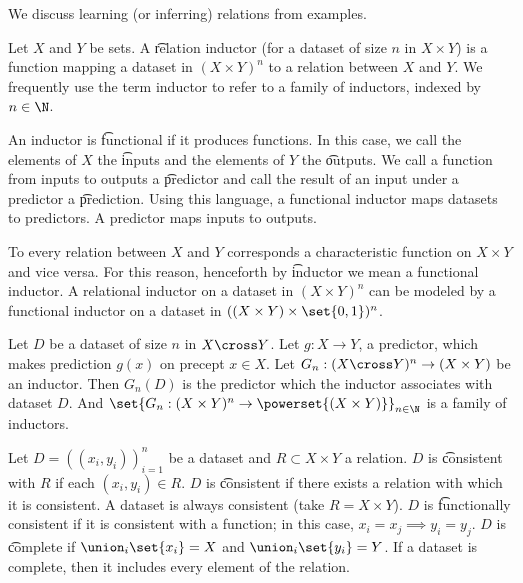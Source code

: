 

We discuss learning (or inferring) relations from examples.


Let $X$ and $Y$ be sets.
A \t{relation inductor} (for a dataset of size $n$ in $X \times Y$) is a function mapping a dataset in $(X \times Y)^n$ to a relation between $X$ and $Y$.
We frequently use the term inductor to refer to a family of inductors, indexed by $n \in \N$.

An inductor is \t{functional} if it produces functions.
In this case, we call the elements of $X$ the \t{inputs} and the elements of $Y$ the \t{outputs}.
We call a function from inputs to outputs a \t{predictor}    and call the result of an input under a predictor a \t{prediction}.
Using this language, a functional inductor maps datasets to predictors.
A predictor maps inputs to outputs.

To every relation between $X$ and $Y$ corresponds a characteristic function on $X \times Y$ and vice versa.
For this reason, henceforth by \t{inductor} we mean a functional inductor.
A relational inductor on a dataset in $(X \times Y)^n$ can be modeled by a functional inductor on a dataset in $((X \times Y) \times \set{0, 1})^n$.


Let $D$ be a dataset of size $n$ in $X \cross Y$.
Let $g: X \to Y$, a predictor, which makes prediction $g(x)$ on precept $x \in X$.
Let $G_n: (X \cross Y)^n \to (X \times Y)$ be an inductor.
Then $G_n(D)$ is the predictor which the inductor associates with dataset $D$.
And $\set{G_n: (X \times Y)^n \to \powerset{(X \times Y)}}_{n \in \N}$ is a family of inductors.


Let $D = ((x_i, y_i))_{i =1}^{n}$ be a dataset and $R \subset X \times Y$ a relation.
$D$ is \t{consistent with $R$} if each $(x_i, y_i) \in R$.
$D$ is \t{consistent} if there exists a relation with which it is consistent.
A dataset is always consistent (take $R = X \times Y$).
$D$ is \t{functionally consistent} if it is consistent with a function; in this case, $x_i = x_j \implies y_i = y_j$.
$D$ is \t{complete} if $\union_i\set{x_i} = X$ and $\union_i\set{y_i} = Y$.
If a dataset is complete, then it includes every element of the relation.


